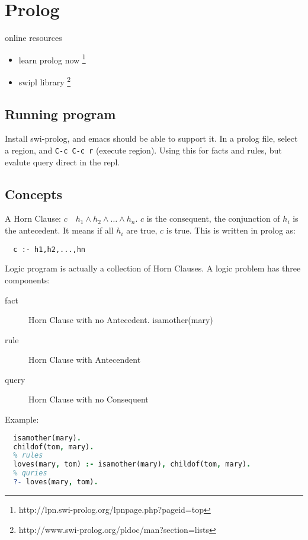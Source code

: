 \section{Prolog}

online resources
\begin{itemize}
\item learn prolog now \footnote{http://lpn.swi-prolog.org/lpnpage.php?pageid=top}
\item swipl library \footnote{http://www.swi-prolog.org/pldoc/man?section=lists}
\end{itemize}

\subsection{Running program}

Install swi-prolog, and emacs should be able to support it.  In a
prolog file, select a region, and \texttt{C-c C-c r} (execute region).
Using this for facts and rules, but evalute query direct in the repl.

\subsection{Concepts}

A Horn Clause: $c \quad h_1 \wedge h_2 \wedge \ldots \wedge h_n$.
$c$ is the consequent, the conjunction of $h_i$ is the antecedent.
It means if all $h_i$ are true, $c$ is true.
This is written in prolog as:

\begin{lstlisting}
  c :- h1,h2,...,hn
\end{lstlisting}

Logic program is actually a collection of Horn Clauses.
A logic problem has three components:
\begin{description}
\item [fact] Horn Clause with no Antecedent. isamother(mary)
\item [rule] Horn Clause with Antecendent
\item [query] Horn Clause with no Consequent
\end{description}

Example:

\begin{lstlisting}[language=prolog]
  % facts
  isamother(mary).
  childof(tom, mary).
  % rules
  loves(mary, tom) :- isamother(mary), childof(tom, mary).
  % quries
  ?- loves(mary, tom).
\end{lstlisting}

